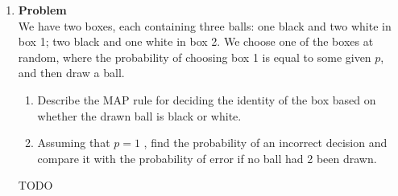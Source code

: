 \documentclass[12pt]{article}
\newenvironment{Ex}{\textbf{Problem}\vspace{.75em}\\}{}
\begin{document}
\begin{enumerate}
\item
  \begin{Ex}
    We have two boxes, each containing three balls: one black and two
    white in box 1; two black and one white in box 2. We choose one of
    the boxes at random, where the probability of choosing box 1 is
    equal to some given $p$, and then draw a ball.
    \begin{enumerate}
    \item Describe the MAP rule for deciding the identity of the box
      based on whether the drawn ball is black or white.
    \item Assuming that $p = 1$ , find the probability of an incorrect
      decision and compare it with the probability of error if no ball
      had 2 been drawn.
    \end{enumerate}
    \begin{solution} \hfill
      {\color{red} \huge TODO}
    \end{solution}
  \end{Ex}

\end{enumerate}
\end{document}
